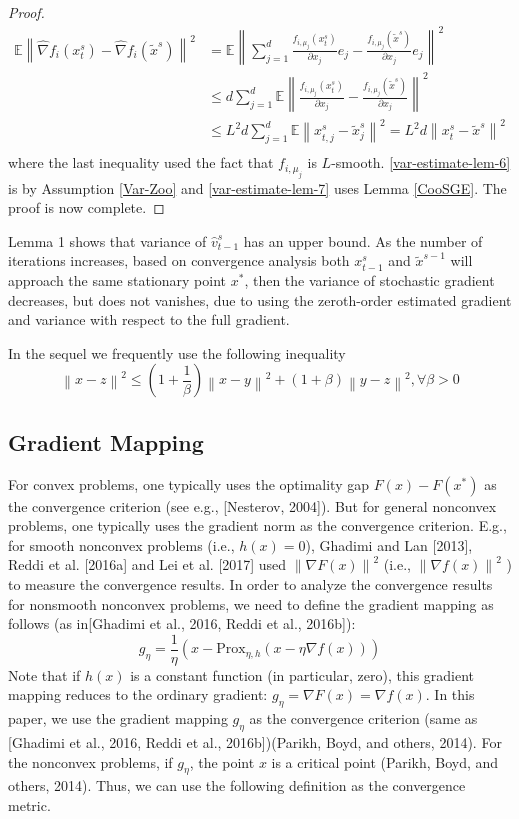 \documentclass{article}
\newcommand*{\Po}{\text{Prox}}
\newcommand*{\E}{\mathbb{E}}
\newcommand{\norm}[1]{\left\lVert#1\right\rVert}
\theoremstyle{definition}
\theoremstyle{remark}
\begin{document}
\begin{proof}
\begin{equation}
 \begin{split}
 \E \norm{\hat{\nabla} f_i(x_{t}^s)-\hat{\nabla} f_i(\tilde{x}^s)}^2 &= \E \norm{ \sum_{j=1}^d\frac{f_{i,\mu_j}(x_{t}^s)}{\partial x_j}e_j-\frac{f_{i,\mu_j}(\tilde{x}^s)}{\partial x_j}e_j}^2\\
 &\leq d \sum_{j=1}^d \E \norm{ \frac{f_{i,\mu_j}(x_{t}^s)}{\partial x_j}-\frac{f_{i,\mu_j}(\tilde{x}^s)}{\partial x_j}}^2\\
 &\leq L^2 d \sum_{j=1}^d \E \norm{x_{t,j}^s-\tilde{x}_{j}^s}^2 = L^2 d \norm{x_{t}^s-\tilde{x}^s}^2\\
 \end{split}
 \end{equation}
  where the last inequality used the fact that $f_{i,\mu_j}$ is $L$-smooth. \eqref{var-estimate-lem-6} is by Assumption \ref{Var-Zoo} and \eqref{var-estimate-lem-7} uses Lemma \ref{CooSGE}. The proof is now complete.
\end{proof}
{\color{Green}
Lemma 1 shows that variance of $\hat{v}_{t-1}^s$ has an upper bound. As the number of iterations increases, based on convergence analysis both $x_{t-1}^s$ and $\widetilde{x}^{s-1}$ will approach the same stationary point $x^*$, then the
variance of stochastic gradient decreases, but does not vanishes, due to using the zeroth-order estimated gradient and variance with respect to the full gradient.
}

In the sequel we frequently use the following inequality
\begin{equation}\label{young}
\norm{x-z}^2 \leq (1+\frac{1}{\beta})\norm{x-y}^2 + (1+\beta) \norm{{y-z}}^2, \forall \beta> 0
\end{equation}
\subsection{Gradient Mapping}
{\color{Violet}
For convex problems, one typically uses the optimality gap $F(x) - F(x^*)$ as the convergence criterion (see e.g.,
[Nesterov, 2004]). But for general nonconvex problems, one typically uses the gradient norm as the convergence
criterion. E.g., for smooth nonconvex problems (i.e., $h(x) = 0$), Ghadimi and Lan [2013], Reddi et al. [2016a]
and Lei et al. [2017] used $\norm{\nabla F(x)}^2$ (i.e., $\norm{\nabla f(x)}^2$ ) to measure the convergence results. In order to analyze the
convergence results for nonsmooth nonconvex problems, we need to define the gradient mapping as follows (as in[Ghadimi et al., 2016, Reddi et al., 2016b]):
\begin{equation}
g_{\eta} = \frac{1}{\eta}(x-\Po_{\eta,h}(x-\eta \nabla f(x)))
\end{equation}
Note that if $h(x)$ is a constant function (in particular, zero), this gradient mapping reduces to the ordinary gradient:
$g_{\eta} = \nabla F(x) = \nabla f(x)$. In this paper, we use the gradient mapping $g_{\eta}$ as the convergence criterion (same as
[Ghadimi et al., 2016, Reddi et al., 2016b]){\color{Green}(Parikh, Boyd, and others, 2014)}.}
{\color{Green}
For the nonconvex problems, if $g_{\eta}$, the point $x$ is a critical point (Parikh, Boyd, and others, 2014). Thus, we can
use the following definition as the convergence metric.
}
\end{document}
